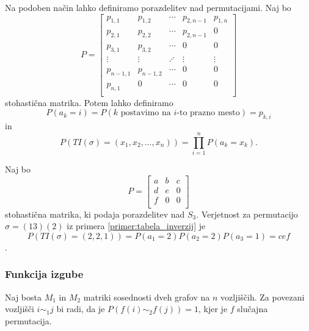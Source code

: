\documentclass[mat2, tisk]{fmfdelo}
\newcommand{\TODO}[1]{{\color{blue} TODO: #1}}
\begin{document}
            Na podoben način lahko definiramo porazdelitev nad permutacijami.
            Naj bo
            $$P =
            \begin{bmatrix}
              p_{1,1} & p_{1,2} & \dotsm & p_{2, n-1} & p_{1,n} \\
              p_{2,1} & p_{2,2} & \dotsm & p_{2, n-1} & 0 \\
              p_{3,1} & p_{3,2} & \dotsm & 0 & 0 \\
              \vdots & \vdots & \iddots & \vdots & \vdots    \\
              p_{n-1,1} & p_{n-1,2}  & \dotsm & 0  & 0\\
              p_{n,1} & 0  & \dotsm & 0  & 0\\
            \end{bmatrix}$$
            stohastična matrika. Potem lahko definiramo
            $$P(a_k = i) = P(k\text{ postavimo na } i\text{-to prazno
            mesto}) = p_{k, i}$$
            in
            $$P(TI(\sigma) = (x_1, x_2, \dotsc, x_n)) = \prod_{i=1}^n
            P(a_k = x_k).$$
            \begin{primer}
              Naj bo
              $$
              P =
              \begin{bmatrix}
                a & b & c \\
                d & e & 0 \\
                f & 0 & 0 \\
              \end{bmatrix}
              $$
              stohastična matrika, ki podaja porazdelitev nad $S_3$.
              Verjetnost za permutacijo $\sigma = (13)(2)$ iz primera
              \ref{primer:tabela_inverzij} je
              $$P(TI(\sigma) = (2, 2, 1)) = P(a_1 = 2) P(a_2 = 2)
              P(a_3 = 1) = cef$$.
            \end{primer}
            \subsubsection{Funkcija izgube}
            Naj bosta $M_1$ in $M_2$ matriki sosednosti dveh grafov
            na $n$ vozljiščih. Za povezani vozljišči $i \sim_1 j$ bi radi, da je
            $P(f(i) \sim_2 f(j)) = 1$, kjer je $f$ slučajna permutacija.
\end{document}
